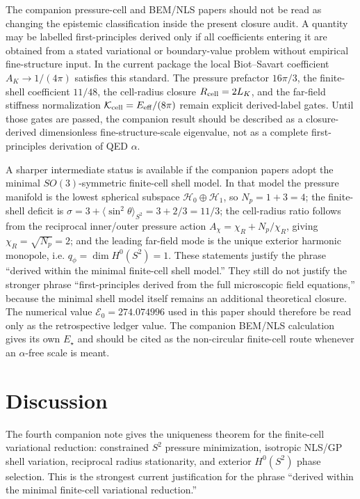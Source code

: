 \documentclass[aps,pra,preprint,longbibliography,nofootinbib]{revtex4-2}
\newcommand{\Et}{\mathcal{E}_0}                    %
\begin{document}
The companion pressure-cell and BEM/NLS papers should not be read as changing
the epistemic classification inside the present closure audit.  A quantity may
be labelled first-principles derived only if all coefficients entering it are
obtained from a stated variational or boundary-value problem without empirical
fine-structure input.  In the current package the local Biot--Savart coefficient
\(A_K\to1/(4\pi)\) satisfies this standard.  The pressure prefactor \(16\pi/3\),
the finite-shell coefficient \(11/48\), the cell-radius closure
\(R_{\rm cell}=2L_K\), and the far-field stiffness normalization
\(\mathcal K_{\rm cell}=E_{\rm eff}/(8\pi)\) remain explicit derived-label
gates.  Until those gates are passed, the companion result should be described
as a closure-derived dimensionless fine-structure-scale eigenvalue, not as a
complete first-principles derivation of QED \(\alpha\).

A sharper intermediate status is available if the companion papers adopt the
minimal \(SO(3)\)-symmetric finite-cell shell model.  In that model the
pressure manifold is the lowest spherical subspace
\(\mathcal H_0\oplus\mathcal H_1\), so \(N_p=1+3=4\); the finite-shell deficit
is
\(\sigma=3+\langle\sin^2\theta\rangle_{S^2}=3+2/3=11/3\); the cell-radius
ratio follows from the reciprocal inner/outer pressure action
\(A_\chi=\chi_R+N_p/\chi_R\), giving \(\chi_R=\sqrt{N_p}=2\); and the leading
far-field mode is the unique exterior harmonic monopole, i.e.
\(q_\phi=\dim H^0(S^2)=1\).  These statements justify the phrase
``derived within the minimal finite-cell shell model.''  They still do not
justify the stronger phrase ``first-principles derived from the full microscopic
field equations,'' because the minimal shell model itself remains an additional
theoretical closure.  The numerical value \(\Et=274.074996\) used in this
paper should therefore be read only as the retrospective ledger value.  The
companion BEM/NLS calculation gives its own \(E_\star\) and should be cited as
the non-circular finite-cell route whenever an \(\alpha\)-free scale is meant.

\section{Discussion}

The fourth companion note gives the uniqueness theorem for the finite-cell
variational reduction: constrained \(S^2\) pressure minimization, isotropic
NLS/GP shell variation, reciprocal radius stationarity, and exterior
\(H^0(S^2)\) phase selection.  This is the strongest current justification for
the phrase ``derived within the minimal finite-cell variational reduction.''
\end{document}
